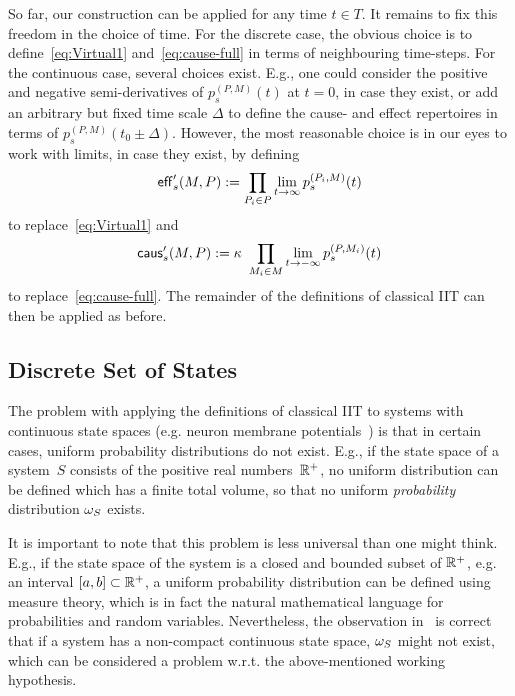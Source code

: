 So far, our construction can be applied for any time $t \in T$. It remains to fix this freedom in the choice of time.
For the discrete case, the obvious choice is to define~\eqref{eq:Virtual1} and~\eqref{eq:cause-full} in terms of neighbouring time-steps.
For the continuous case, several choices exist. E.g., one could consider the positive and negative semi-derivatives of 
$p_{s}^{(P,M)}(t)$ at $t=0$, in case they exist, or add an arbitrary but fixed time scale $\Delta$ to define
the cause- and effect repertoires in terms of $p_{s}^{(P,M)}(t_0\pm\Delta)$. However, the most reasonable choice is in our eyes to work with limits, in case they exist, by defining 
\begin{equation}
\mathsf{eff}'_s(M,P) := \prod_{P_i\in P} \lim_{t \rightarrow \infty} p_{s}^{(P_i,M)}(t)
\end{equation}
to replace~\eqref{eq:Virtual1} and
\begin{equation}
\mathsf{caus}'_s(M,P) := \kappa \  \prod_{M_i\in M} \lim_{t \rightarrow - \infty} p_{s}^{(P,M_i)}(t)
\end{equation}
to replace~\eqref{eq:cause-full}. The remainder of the definitions of classical IIT can then be applied as before.

\subsection{Discrete Set of States}
The problem with applying the definitions of classical IIT to systems with continuous state spaces (e.g. neuron membrane potentials~\cite{BarrettMediano.2019}) is that in certain cases, uniform probability distributions do not exist. E.g., if the state space of a system~$S$ consists of the positive real numbers~$\mathbb{R}^+$, no uniform distribution can be defined which has a finite total volume, so that no uniform \emph{probability} distribution ${\omega_{S}}$ exists.

It is important to note that this problem is less universal than one might think. E.g., if the state space of the system is a closed and bounded subset of $\mathbb{R}^+$, e.g. an interval $[a,b] \subset \mathbb{R}^+$, a uniform probability distribution can be defined using measure theory, which is in fact the natural mathematical language for probabilities and random variables. Nevertheless, the observation in~\cite{BarrettMediano.2019} is correct that if a system has a non-compact continuous state space, ${\omega_{S}}$ might not exist, which can be considered a problem w.r.t. the above-mentioned working hypothesis.

